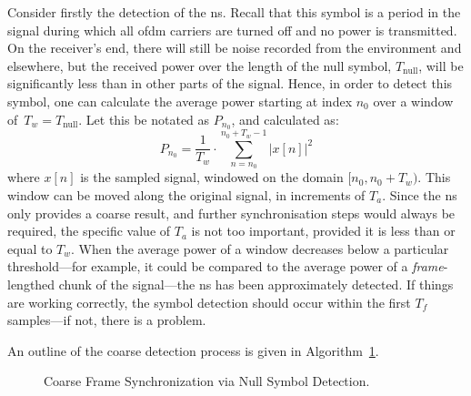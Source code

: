\documentclass[class=report,11pt,crop=false]{standalone}
\begin{document}
Consider firstly the detection of the \gls{ns}. Recall that this symbol is a period in the signal during which all \gls{ofdm} carriers are turned off and no power is transmitted. On the receiver's end, there will still be noise recorded from the environment and elsewhere, but the received power over the length of the null symbol, \(T_\textrm{null}\), will be significantly less than in other parts of the signal. Hence, in order to detect this symbol, one can calculate the average power starting at index \(n_0\) over a window of~\(T_w = T_\textrm{null}\). Let this be notated as \(P_{n_0}\), and calculated as:
\begin{equation}
  P_{n_0} = \frac{1}{T_w} \cdot \sum^{n_0 + T_w - 1}_{n=n_0} \left| x[n] \right|^2
\end{equation}
where \(x[n]\) is the sampled signal, windowed on the domain \([n_0, n_0 + T_w)\). This window can be moved along the original signal, in increments of \(T_a\). Since the \gls{ns} only provides a coarse result, and further synchronisation steps would always be required, the specific value of \(T_a\) is not too important, provided it is less than or equal to \(T_w\). When the average power of a window decreases below a particular threshold---for example, it could be compared to the average power of a \emph{frame}-lengthed chunk of the signal---the \gls{ns} has been approximately detected. If things are working correctly, the symbol detection should occur within the first \(T_f\) samples---if not, there is a problem.

An outline of the coarse detection process is given in Algorithm~\ref{alg:null_symbol_detect}.

\begin{figure}[ht]
  \vspace{0.5cm}
  \centering
  \captionsetup{type=figure}
  \begin{minipage}{.75\linewidth}
    \begin{algorithm}[H]
      \caption{Coarse Frame Synchronization via Null Symbol Detection.\label{alg:null_symbol_detect}}

      \DontPrintSemicolon
      \SetAlgoLined


      \BlankLine
      \vspace{0.5cm}
    \end{algorithm}
  \end{minipage}
\end{figure}
\end{document}
